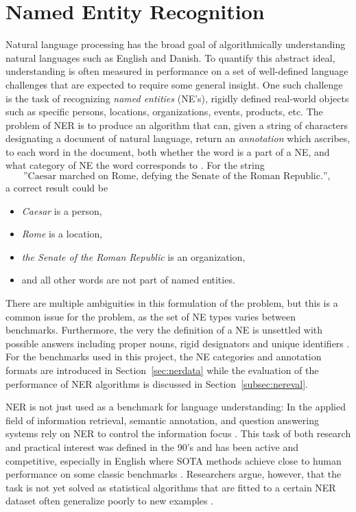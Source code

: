 \documentclass[main.tex]{subfiles}
\begin{document}
\section{Named Entity Recognition}
Natural language processing has the broad goal of algorithmically understanding natural languages such as English and Danish.
To quantify this abstract ideal, understanding is often measured in performance on a set of well-defined language challenges that are expected to require some general insight.
One such challenge is the task of recognizing \emph{named entities} (NE's), rigidly defined real-world objects such as specific persons, locations, organizations, events, products, etc.
The problem of NER is to produce an algorithm that can, given a string of characters designating a document of natural language, return an \emph{annotation} which ascribes, to each word in the document, both whether the word is a part of a NE, and what category of NE the word corresponds to \cite{wiki2021ner}.
For the string
\[
    \text{
        ''Caesar marched on Rome, defying the Senate of the Roman Republic.'',
    }
\]
a correct result could be
\begin{itemize}
    \item \emph{Caesar} is a person,
    \item \emph{Rome} is a location,
    \item \emph{the Senate of the Roman Republic} is an organization,
    \item and all other words are not part of named entities.
\end{itemize}
There are multiple ambiguities in this formulation of the problem, but this is a common issue for the problem, as the set of NE types varies between benchmarks.
Furthermore, the very the definition of a NE is unsettled with possible answers including proper nouns, rigid designators and unique identifiers \cite[Sec. 4]{marrero2013ner}.
For the benchmarks used in this project, the NE categories and annotation formats are introduced in Section~\ref{sec:nerdata} while the evaluation of the performance of NER algorithms is discussed in Section~\ref{subsec:nereval}.

NER is not just used as a benchmark for language understanding:
In the applied field of information retrieval, semantic annotation, and question answering systems rely on NER to control the information focus \cite[Sec. 2]{marrero2013ner}.
This task of both research and practical interest was defined in the 90's and has been active and competitive, especially in English where SOTA methods achieve close to human performance on some classic benchmarks \cite{wiki2021ner, marrero2013ner}.
Researchers argue, however, that the task is not yet solved as statistical algorithms that are fitted to a certain NER dataset often generalize poorly to new examples \cite[Sec. 7.2]{marrero2013ner}.
\end{document}
